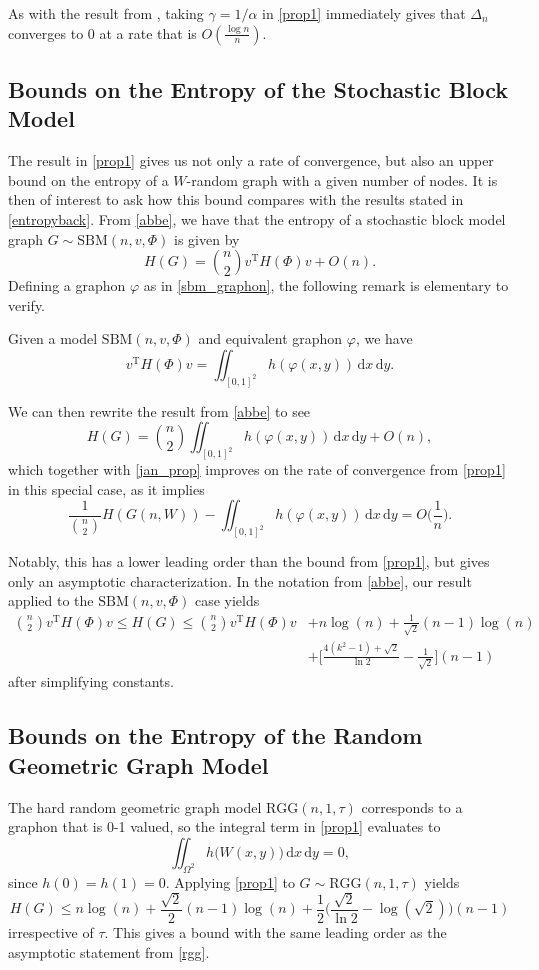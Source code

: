 \documentclass{svproc}
\newcommand{\1}{\mathbbm{1}}
\renewcommand{\phi}{\varphi}
\newcommand{\T}{\mathrm{T}}
\newcommand{\dd}{\,\mathrm{d}}
\begin{document}
As with the result from \cite{bakerpaper}, taking $\gamma=1/\alpha$ in \cref{prop1} immediately gives that $\Delta_n$ converges to 0 at a rate that is $O(\frac{\log n}{n})$. 

\subsection{Bounds on the Entropy of the Stochastic Block Model}
The result in \cref{prop1} gives us not only a rate of convergence, but also an upper bound on the entropy of a $W$-random graph with a given number of nodes. It is then of interest to ask how this bound compares with the results stated in \cref{entropyback}.  From \cref{abbe}, we have that the entropy of a stochastic block model graph $G\sim\mathrm{SBM}(n,v,\Phi)$ is given by
\[H(G) = \binom{n}{2}v^\T H(\Phi) v+O(n).\]
Defining a graphon $\phi$ as in \cref{sbm_graphon}, the following remark is elementary to verify.
\begin{remark}
Given a model $\mathrm{SBM}(n,v,\Phi)$ and equivalent graphon $\phi$, we have
\[v^\T H(\Phi)v = \iint_{[0,1]^2}h(\phi(x,y))\dd x\dd y.\]
\end{remark}

We can then rewrite the result from \cref{abbe} to see
\[H(G) = \binom{n}{2}\iint_{[0,1]^2}h(\phi(x,y))\dd x\dd y+O(n),\]
which together with \cref{jan_prop} improves on the rate of convergence from \cref{prop1} in this special case, as it implies
\[\frac{1}{\binom n2}H(G(n,W)) -\iint_{[0,1]^2}h(\phi(x,y))\dd x\dd y = O\Big(\frac{1}{n}\Big).\]

Notably, this has a lower leading order than the bound from \cref{prop1}, but gives only an asymptotic characterization. In the notation from \cref{abbe}, our result applied to the $\mathrm{SBM}(n,v,\Phi)$ case yields
\begin{align*}\binom{n}{2}v^\T H(\Phi)v\leq H(G)\leq\binom{n}{2}v^\T H(\Phi)v&+n\log(n)+\frac{1}{\sqrt{2}}(n-1)\log(n)\\&+\Big[\frac{4(k^2-1)+\sqrt{2}}{\ln 2}-\frac{1}{\sqrt{2}}\Big](n-1)\end{align*}
after simplifying constants.

\subsection{Bounds on the Entropy of the Random Geometric Graph Model}

The hard random geometric graph model $\mathrm{RGG}(n,1,\tau)$ corresponds to a graphon that is 0-1 valued, so the integral term in \cref{prop1} evaluates to 
\[\iint_{\Omega^2}h\big(W(x,y)\big)\dd x\dd y=0,\] 
since $h(0)=h(1)=0$. Applying \cref{prop1} to $G\sim\mathrm{RGG}(n,1,\tau)$ yields
\[H(G)\leq n\log(n)+\frac{\sqrt{2}}{2}(n-1)\log(n)+\frac{1}{2}\Big(\frac{\sqrt{2}}{\ln 2}-\log(\sqrt{2})\Big)(n-1)\]
irrespective of $\tau$. This gives a bound with the same leading order as the asymptotic statement from \cref{rgg}.
\end{document}
